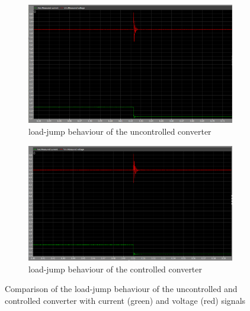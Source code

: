 \begin{figure}[htbp]
    \centering
    \begin{subfigure}[b]{0.49\textwidth}
        \centering
        \includegraphics[width=\textwidth]{img/v_i_load_jump.png}
        \caption{load-jump behaviour of the uncontrolled converter}
        \label{fig:v_i_load_jump_uncontrolled}
    \end{subfigure}
    \hfill
    \begin{subfigure}[b]{0.49\textwidth}
        \centering
        \includegraphics[width=\textwidth]{img/v_i_control_load_jump.png}
        \caption{load-jump behaviour of the controlled converter}
        \label{fig:v_i_load_jump_controlled}
    \end{subfigure}
    \caption{Comparison of the load-jump behaviour of the uncontrolled and controlled converter with current (green) and voltage (red) signals}
    \label{fig:comparison_load_jump}
\end{figure}

